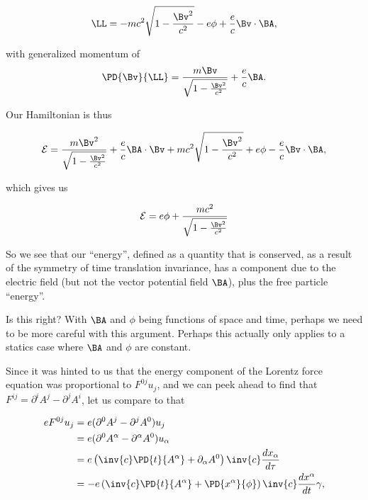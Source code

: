{\begin{equation}\label{eqn:relativisticElectrodynamicsT3:531}
\LL = 
- m c^2 \sqrt{1 - \frac{\Bv^2}{c^2}} - e \phi + \frac{e}{c} \Bv \cdot \BA,
\end{equation}

with generalized momentum of 
\begin{equation}\label{eqn:relativisticElectrodynamicsT3:532}
\PD{\Bv}{\LL} = \frac{m \Bv}{\sqrt{1 - \frac{\Bv^2}{c^2}}} + \frac{e}{c} \BA.
\end{equation}

Our Hamiltonian is thus

\begin{equation}\label{eqn:relativisticElectrodynamicsT3:1050}
\begin{aligned}
\mathcal{E} 
= 
\frac{m \Bv^2}{\sqrt{1 - \frac{\Bv^2}{c^2}}} + \frac{e}{c} \BA \cdot \Bv
+ m c^2 \sqrt{1 - \frac{\Bv^2}{c^2}} + e \phi - \frac{e}{c} \Bv \cdot \BA,
\end{aligned}
\end{equation}

which gives us

\begin{equation}\label{eqn:relativisticElectrodynamicsT3:1070}
\begin{aligned}
\mathcal{E} = e \phi + \frac{m c^2}{\sqrt{1 - \frac{\Bv^2}{c^2}}} 
\end{aligned}
\end{equation}

So we see that our ``energy'', defined as a quantity that is conserved, as a result of the symmetry of time translation invariance, has a component due to the electric field (but not the vector potential field $\BA$), plus the free particle ``energy''.

Is this right?  With $\BA$ and $\phi$ being functions of space and time, perhaps we need to be more careful with this argument.  Perhaps this actually only applies to a statics case where $\BA$ and $\phi$ are constant.

Since it was hinted to us that the energy component of the Lorentz force equation was proportional to $F^{0j} u_j$, and we can peek ahead to find that $F^{ij} = \partial^i A^j - \partial^j A^i$, let us compare to that

\begin{equation}\label{eqn:relativisticElectrodynamicsT3:1090}
\begin{aligned}
e F^{0 j} u_j
&=
e (\partial^0 A^j - \partial^j A^0) u_j \\
&=
e (\partial^0 A^\alpha - \partial^\alpha A^0) u_\alpha \\
&=
e \left( \inv{c} \PD{t}{A^\alpha} + \partial_\alpha A^0 \right) \inv{c} \frac{dx_\alpha}{d\tau} \\
&=
-e \left( \inv{c} \PD{t}{A^\alpha} + \PD{x^\alpha}{\phi} \right) \inv{c} \frac{dx^\alpha}{dt} \gamma,
\end{aligned}
\end{equation}

}
